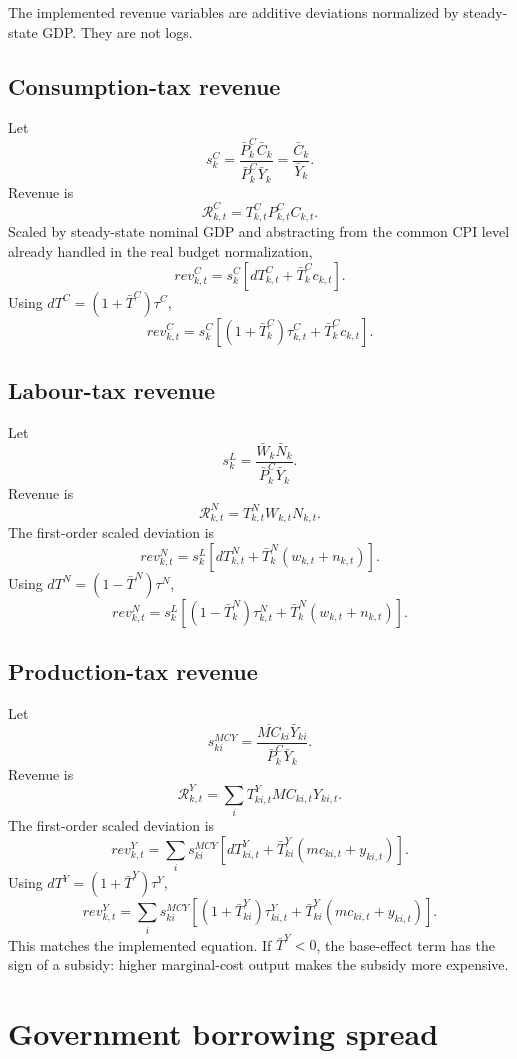 \documentclass[11pt]{article}
\newcommand{\TC}{T^C}
\newcommand{\TN}{T^N}
\newcommand{\TY}{T^Y}
\newcommand{\tauc}{\tau^C}
\newcommand{\taun}{\tau^N}
\newcommand{\tauy}{\tau^Y}
\newcommand{\Pc}{P^C}
\newcommand{\MC}{MC}
\begin{document}
The implemented revenue variables are additive deviations normalized by
steady-state GDP. They are not logs.

\subsection{Consumption-tax revenue}

Let
\[
  s^C_k=\frac{\bar\Pc_k\bar C_k}{\bar\Pc_k\bar Y_k}
  =\frac{\bar C_k}{\bar Y_k}.
\]
Revenue is
\[
  \mathcal R^C_{k,t}=\TC_{k,t}\Pc_{k,t}C_{k,t}.
\]
Scaled by steady-state nominal GDP and abstracting from the common CPI level
already handled in the real budget normalization,
\[
  rev^C_{k,t}
  =
  s^C_k
  \left[
    d\TC_{k,t}
    +\bar\TC_k c_{k,t}
  \right].
\]
Using \(d\TC=(1+\bar\TC)\tauc\),
\[
  rev^C_{k,t}
  =
  s^C_k
  \left[
    (1+\bar\TC_k)\tauc_{k,t}
    +\bar\TC_k c_{k,t}
  \right].
\]

\subsection{Labour-tax revenue}

Let
\[
  s^L_k=\frac{\bar W_k\bar N_k}{\bar\Pc_k\bar Y_k}.
\]
Revenue is
\[
  \mathcal R^N_{k,t}=\TN_{k,t}W_{k,t}N_{k,t}.
\]
The first-order scaled deviation is
\[
  rev^N_{k,t}
  =
  s^L_k
  \left[
    d\TN_{k,t}
    +\bar\TN_k(w_{k,t}+n_{k,t})
  \right].
\]
Using \(d\TN=(1-\bar\TN)\taun\),
\[
  rev^N_{k,t}
  =
  s^L_k
  \left[
    (1-\bar\TN_k)\taun_{k,t}
    +\bar\TN_k(w_{k,t}+n_{k,t})
  \right].
\]

\subsection{Production-tax revenue}

Let
\[
  s^{MCY}_{k i}=\frac{\overline{\MC}_{k i}\bar Y_{k i}}{\bar\Pc_k\bar Y_k}.
\]
Revenue is
\[
  \mathcal R^Y_{k,t}=\sum_i \TY_{k i,t}\MC_{k i,t}Y_{k i,t}.
\]
The first-order scaled deviation is
\[
  rev^Y_{k,t}
  =
  \sum_i s^{MCY}_{k i}
  \left[
    d\TY_{k i,t}
    +\bar\TY_{k i}(mc_{k i,t}+y_{k i,t})
  \right].
\]
Using \(d\TY=(1+\bar\TY)\tauy\),
\[
  rev^Y_{k,t}
  =
  \sum_i s^{MCY}_{k i}
  \left[
    (1+\bar\TY_{k i})\tauy_{k i,t}
    +\bar\TY_{k i}(mc_{k i,t}+y_{k i,t})
  \right].
\]
This matches the implemented equation. If \(\bar\TY<0\), the base-effect term
has the sign of a subsidy: higher marginal-cost output makes the subsidy more
expensive.

\section{Government borrowing spread}
\end{document}
